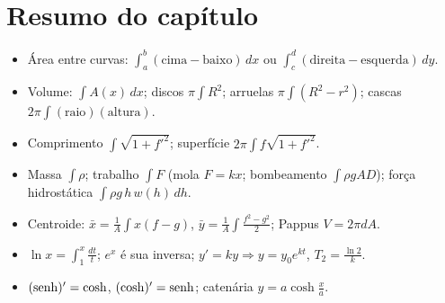 \section*{Resumo do capítulo}
\begin{itemize}
\item Área entre curvas: $\int_a^b(\text{cima}-\text{baixo})\,dx$ ou
  $\int_c^d(\text{direita}-\text{esquerda})\,dy$.
\item Volume: $\int A(x)\,dx$; discos $\pi\int R^2$; arruelas $\pi\int(R^2-r^2)$; cascas
  $2\pi\int(\text{raio})(\text{altura})$.
\item Comprimento $\int\sqrt{1+f'^2}$; superfície $2\pi\int f\sqrt{1+f'^2}$.
\item Massa $\int\rho$; trabalho $\int F$ (mola $F=kx$; bombeamento $\int\rho gAD$); força
  hidrostática $\int\rho g\,h\,w(h)\,dh$.
\item Centroide: $\bar x=\frac1A\int x(f-g)$, $\bar y=\frac1A\int\frac{f^2-g^2}2$; Pappus
  $V=2\pi dA$.
\item $\ln x=\int_1^x\frac{dt}t$; $e^x$ é sua inversa; $y'=ky\Rightarrow y=y_0e^{kt}$,
  $T_2=\frac{\ln2}k$.
\item $(\operatorname{senh})'=\cosh$, $(\cosh)'=\operatorname{senh}$; catenária $y=a\cosh\frac xa$.
\end{itemize}


